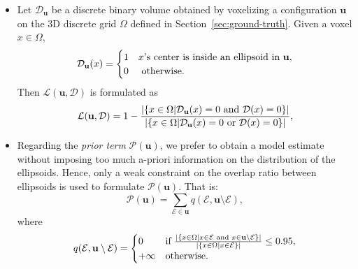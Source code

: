 \documentclass[journal]{IEEEtran}
\begin{document}
\begin{itemize}
\item
  Let $\mathcal{D}_{\mathbf{u}}$ be a discrete binary volume obtained
  by voxelizing a configuration $\mathbf{u}$ on the 3D discrete grid
  $\Omega$ defined in Section~\ref{sec:ground-truth}. Given a voxel
  $x \in \Omega$,
  \begin{equation}
    \label{eq:configuration-voxel}
    \mathcal{\mathcal{D}_{\mathbf{u}}}(x) =
    \begin{cases}
      1 & x\textnormal{'s center is inside an ellipsoid in }\mathbf{u}, \\
      0 & \textnormal{ otherwise}. \\
    \end{cases}
  \end{equation}
  Then $\mathcal{L}(\mathbf{u}, \mathcal{D})$ is formulated as
  \begin{equation}
    \label{eq:data-term1-single}
    \mathcal{L}(\mathbf{u}, \mathcal{D}) = 1 - \frac{ |
      \{ x \in \Omega | \mathcal{D}_{\mathbf{u}}(x) = 0 \textnormal{
        and } \mathcal{D}(x) = 0 \} |} {
      |\{ x \in \Omega | \mathcal{D}_{\mathbf{u}}(x) = 0 \textnormal{
        or } \mathcal{D}(x) = 0 \}|},
  \end{equation}

\item Regarding the \textit{prior term} $\mathcal{P} (\mathbf{u})$, we
  prefer to obtain a model estimate without imposing too much a-priori
  information on the distribution of the ellipsoids. Hence, only a
  weak constraint on the overlap ratio between ellipsoids is used to
  formulate $\mathcal{P} (\mathbf{u})$. That is:
  \begin{equation}
    \label{eq:prior-term}
    \mathcal{P} (\mathbf{u}) = \sum_{\mathcal{E} \in \mathbf{u}}
    q(\mathcal{E}, \mathbf{u} \setminus \mathcal{E}),
  \end{equation}
  where
  \begin{equation}
    \label{eq:prior-term-detail}
    q(\mathcal{E}, \mathbf{u} \setminus \mathcal{E}) =
    \begin{cases}
      0 & \textnormal{if }\frac{ | \{ x \in \Omega | x \in \mathcal{E}
        \textnormal{ and } x \in \mathbf{u} \setminus \mathcal{E} \}
        |} { | \{ x \in \Omega | x \in \mathcal{E} \} |}
      \le 0.95, \\
      +\infty & \textnormal{otherwise}.
    \end{cases}
  \end{equation}

\end{itemize}
\end{document}
